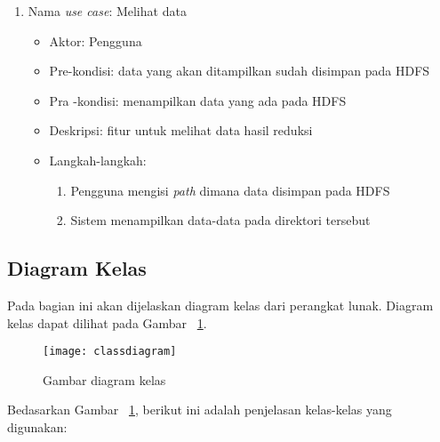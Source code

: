 \begin{enumerate}
\begin{itemize}
\end{itemize}


\item Nama \textit{use case}: Melihat data

\begin{itemize}
\item Aktor: Pengguna

\item Pre-kondisi: data yang akan ditampilkan sudah disimpan pada HDFS

\item Pra -kondisi: menampilkan data yang ada pada HDFS

\item Deskripsi: fitur untuk melihat data hasil reduksi

\item Langkah-langkah:

\begin{enumerate}

\item Pengguna mengisi \textit{path} dimana data disimpan pada HDFS

\item Sistem menampilkan data-data pada direktori tersebut

\end{enumerate}

\end{itemize}

\end{enumerate}


\subsection{Diagram Kelas}

Pada bagian ini akan dijelaskan diagram kelas dari perangkat lunak. Diagram kelas dapat dilihat pada Gambar ~\ref{fig:classdiagram}.

\begin{figure}[H]
    \centering  
    \texttt{[image: classdiagram]}  
    \caption[Gambar diagram kelas]{Gambar diagram kelas} 
    \label{fig:classdiagram} 
\end{figure}

Bedasarkan Gambar ~\ref{fig:classdiagram}, berikut ini adalah penjelasan kelas-kelas yang digunakan:

